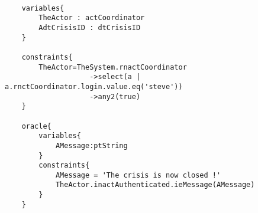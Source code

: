 	\scriptsize
	\vspace{0.5cm}
	\begin{lstlisting}[style=MessirStyle,firstnumber=auto,captionpos=b,caption={\msrmessir (MCL-oriented) specification of the test step \emph{testcase01-ts19oeCloseCrisis}.},label=TM-testcase01-ts19oeCloseCrisis-MCL-LST]

	variables{
		TheActor : actCoordinator
		AdtCrisisID : dtCrisisID
	}
	
	constraints{
		TheActor=TheSystem.rnactCoordinator
		            ->select(a | a.rnctCoordinator.login.value.eq('steve'))
		            ->any2(true)
	}
	
	oracle{
		variables{
			AMessage:ptString
		}
		constraints{
			AMessage = 'The crisis is now closed !'
			TheActor.inactAuthenticated.ieMessage(AMessage)
		}
	}
	
	\end{lstlisting}
	\normalsize 
	
	
